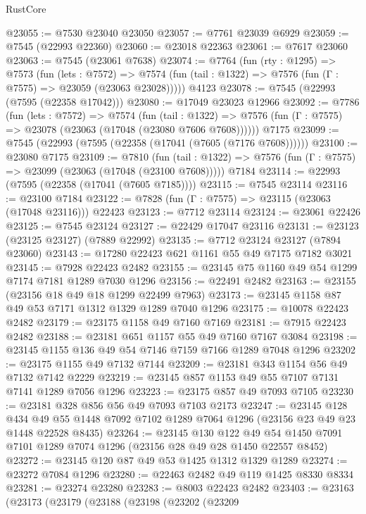 \begin{lexlean}{RustCore}
\begin{coremodule}
@23055 := @7530 @23040 @23050
@23057 := @7761 @23039 @6929
@23059 := @7545 (@22993 @22360)
@23060 := @23018 @22363
@23061 := @7617 @23060
@23063 := @7545 (@23061 @7638)
@23074 := @7764
    (fun (rty : @1295) =>
    @7573
      (fun (lets : @7572) =>
      @7574 (fun (tail : @1322) => @7576 (fun (Γ : @7575) => @23059 (@23063 @23028)))))
    @4123
@23078 := @7545 (@22993 (@7595 (@22358 @17042)))
@23080 := @17049 @23023 @12966
@23092 := @7786
    (fun (lets : @7572) =>
    @7574
      (fun (tail : @1322) =>
      @7576 (fun (Γ : @7575) => @23078 (@23063 (@17048 (@23080 @7606 @7608))))))
    @7175
@23099 := @7545 (@22993 (@7595 (@22358 (@17041 (@7605 (@7176 @7608))))))
@23100 := @23080 @7175
@23109 := @7810
    (fun (tail : @1322) => @7576 (fun (Γ : @7575) => @23099 (@23063 (@17048 (@23100 @7608)))))
    @7184
@23114 := @22993 (@7595 (@22358 (@17041 (@7605 @7185))))
@23115 := @7545 @23114
@23116 := @23100 @7184
@23122 := @7828 (fun (Γ : @7575) => @23115 (@23063 (@17048 @23116))) @22423
@23123 := @7712 @23114
@23124 := @23061 @22426
@23125 := @7545 @23124
@23127 := @22429 @17047 @23116
@23131 := @23123 (@23125 @23127) (@7889 @22992)
@23135 := @7712 @23124 @23127 (@7894 @23060)
@23143 := @17280 @22423 @621 @1161 @55 @49 @7175 @7182 @3021
@23145 := @7928 @22423 @2482
@23155 := @23145 @75 @1160 @49 @54 @1299 @7174 @7181 @1289 @7030 @1296
@23156 := @22491 @2482
@23163 := @23155 (@23156 @18 @49 @18 @1299 @22499 @7963)
@23173 := @23145 @1158 @87 @49 @53 @7171 @1312 @1329 @1289 @7040 @1296
@23175 := @10078 @22423 @2482
@23179 := @23175 @1158 @49 @7160 @7169
@23181 := @7915 @22423 @2482
@23188 := @23181 @651 @1157 @55 @49 @7160 @7167 @3084
@23198 := @23145 @1155 @136 @49 @54 @7146 @7159 @7166 @1289 @7048 @1296
@23202 := @23175 @1155 @49 @7132 @7144
@23209 := @23181 @343 @1154 @56 @49 @7132 @7142 @2229
@23219 := @23145 @857 @1153 @49 @55 @7107 @7131 @7141 @1289 @7056 @1296
@23223 := @23175 @857 @49 @7093 @7105
@23230 := @23181 @328 @856 @56 @49 @7093 @7103 @2173
@23247 := @23145
    @128
    @434
    @49
    @55
    @1448
    @7092
    @7102
    @1289
    @7064
    @1296
    (@23156 @23 @49 @23 @1448 @22528 @8435)
@23264 := @23145
    @130
    @122
    @49
    @54
    @1450
    @7091
    @7101
    @1289
    @7074
    @1296
    (@23156 @28 @49 @28 @1450 @22557 @8452)
@23272 := @23145 @120 @87 @49 @53 @1425 @1312 @1329 @1289
@23274 := @23272 @7084 @1296
@23280 := @22463 @2482 @49 @119 @1425 @8330 @8334
@23281 := @23274 @23280
@23283 := @8003 @22423 @2482
@23403 := @23163
    (@23173
      (@23179
        (@23188
          (@23198
            (@23202
              (@23209

\end{coremodule}
\end{lexlean}
